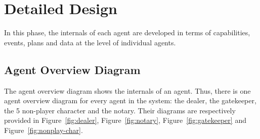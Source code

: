 \documentclass[a4paper]{article}
\begin{document}
\section{Detailed Design}\label{sec:detaildesign}

In this phase, the internals of each agent are developed in terms of capabilities, events, plans and data at the level of individual agents.

\subsection{Agent Overview Diagram}
The agent overview diagram shows the internals of an agent. Thus, there is one agent overview diagram for every agent in the system: the dealer, the gatekeeper, the 5 non-player character and the notary. Their diagrams are respectively provided in Figure~\ref{fig:dealer}, Figure~\ref{fig:notary}, Figure~\ref{fig:gatekeeper} and Figure~\ref{fig:nonplay-char}.
\end{document}
